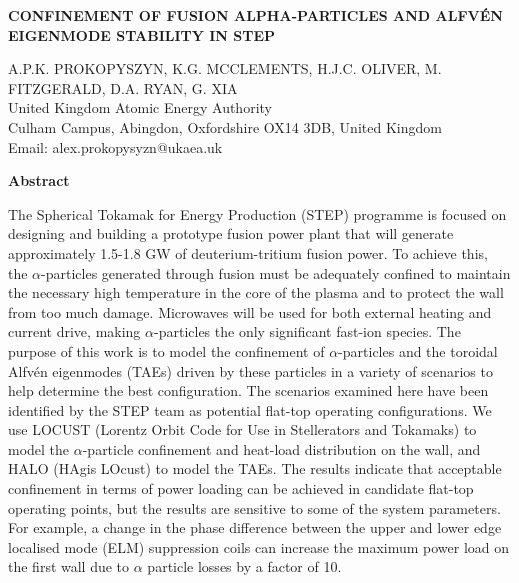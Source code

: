 \documentclass[10pt, a4paper, twoside]{article}
\begin{document}
\begin{flushleft}
\fontsize{12}{14}\selectfont \textbf{CONFINEMENT OF FUSION ALPHA-PARTICLES AND ALFV\'EN EIGENMODE STABILITY IN STEP}

\fontsize{10}{13}\selectfont
A.P.K. PROKOPYSZYN, K.G. MCCLEMENTS, H.J.C. OLIVER, M. FITZGERALD, D.A. RYAN, G. XIA \\
United Kingdom Atomic Energy Authority \\
Culham Campus, Abingdon, Oxfordshire OX14 3DB, United Kingdom \\
Email: alex.prokopysyzn@ukaea.uk

\end{flushleft}

\begin{flushleft}
\textbf{Abstract}
\end{flushleft}

\setlength{\parindent}{1cm}
\fontsize{9}{12pt}\selectfont

The Spherical Tokamak for Energy Production (STEP) programme is focused on designing and building a prototype fusion power plant that will generate approximately 1.5-1.8 GW of deuterium-tritium fusion power. To achieve this, the $\alpha$-particles generated through fusion must be adequately confined to maintain the necessary high temperature in the core of the plasma and to protect the wall from too much damage. Microwaves will be used for both external heating and current drive, making $\alpha$-particles the only significant fast-ion species. The purpose of this work is to model the confinement of $\alpha$-particles and the toroidal Alfvén eigenmodes (TAEs) driven by these particles in a variety of scenarios to help determine the best configuration. The scenarios examined here have been identified by the STEP team as potential flat-top operating configurations. We use LOCUST (Lorentz Orbit Code for Use in Stellerators and Tokamaks) to model the $\alpha$-particle confinement and heat-load distribution on the wall, and HALO (HAgis LOcust) to model the TAEs. The results indicate that acceptable confinement in terms of power loading can be achieved in candidate flat-top operating points, but the results are sensitive to some of the system parameters. For example, a change in the phase difference between the upper and lower edge localised mode (ELM) suppression coils can increase the maximum power load on the first wall due to $\alpha$ particle losses by a factor of 10.
\end{document}
